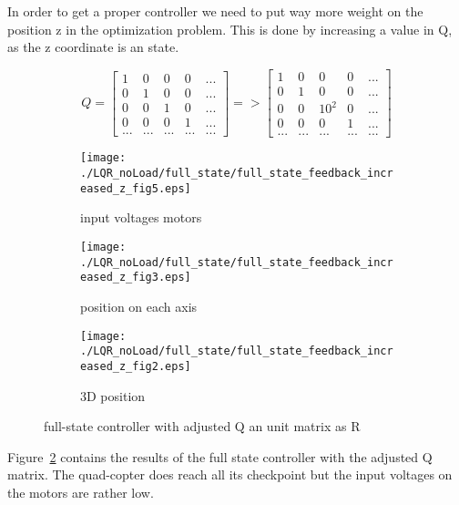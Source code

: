 In order to get a proper controller we need to put way more weight on the position z in the optimization problem. This is done by increasing a value in Q, as the z coordinate is an state. 

$$ 
Q=
\begin{bmatrix}
1 & 0 & 0 & 0 & ... \\
0 & 1 & 0 & 0 & ...\\
0 & 0 & 1 & 0 & ... \\
0 & 0 & 0 & 1 & ... \\
... & ... & ... & ... & ... 
\end{bmatrix}
=>
\begin{bmatrix}
1 & 0 & 0 & 0 & ... \\
0 & 1 & 0 & 0 & ...\\
0 & 0 & 10^2 & 0 & ... \\
0 & 0 & 0 & 1 & ... \\
... & ... & ... & ... & ... 
\end{bmatrix}
$$

\begin{figure}[H]
	\centering
	\begin{subfigure}[b]{0.3\textwidth}
		\texttt{[image: ./LQR\_noLoad/full\_state/full\_state\_feedback\_increased\_z\_fig5.eps]}
		\caption{input voltages motors}
		\label{fig:full-state controller with low voltage}
	\end{subfigure}
	\begin{subfigure}[b]{0.3\textwidth}
		\texttt{[image: ./LQR\_noLoad/full\_state/full\_state\_feedback\_increased\_z\_fig3.eps]}
		\caption{position on each axis}
	\end{subfigure}
	\begin{subfigure}[b]{0.3\textwidth}
		\texttt{[image: ./LQR\_noLoad/full\_state/full\_state\_feedback\_increased\_z\_fig2.eps]}
		\caption{3D position}
	\end{subfigure}
	\caption{full-state controller with adjusted Q an unit matrix as R }\label{fig:full-state controller with adjusted Q matrix but a unit matrix as R}
\end{figure}

Figure~\ref{fig:full-state controller with adjusted Q matrix but a unit matrix as R} contains the results of the full state controller with the adjusted Q matrix. The quad-copter does reach all its checkpoint but the input voltages on the motors are rather low. 

